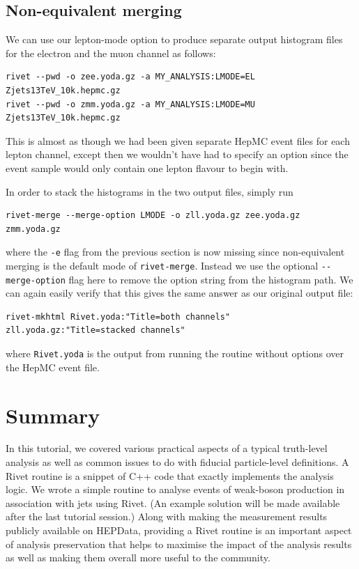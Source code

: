 \documentclass[10pt,fleqn]{scrartcl}
\theoremstyle{exstyle}
\begin{document}
\subsection{Non-equivalent merging}

We can use our lepton-mode option to produce separate output histogram files
for the electron and the muon channel as follows:
\begin{verbatim}
rivet --pwd -o zee.yoda.gz -a MY_ANALYSIS:LMODE=EL Zjets13TeV_10k.hepmc.gz
rivet --pwd -o zmm.yoda.gz -a MY_ANALYSIS:LMODE=MU Zjets13TeV_10k.hepmc.gz
\end{verbatim}
This is almost as though we had been given separate HepMC event files for
each lepton channel, except then we wouldn't have had to specify an option
since the event sample would only contain one lepton flavour to begin with.

In order to stack the histograms in the two output files, simply run
\begin{verbatim}
rivet-merge --merge-option LMODE -o zll.yoda.gz zee.yoda.gz zmm.yoda.gz
\end{verbatim}
where the \verb|-e| flag from the previous section is now missing
since non-equivalent merging is the default mode of \texttt{rivet-merge}.
Instead we use the optional \verb|--merge-option| flag here to remove the
option string from the histogram path. We can again easily verify that
this gives the same answer as our original output file:
\begin{footnotesize}
\begin{verbatim}
rivet-mkhtml Rivet.yoda:"Title=both channels" zll.yoda.gz:"Title=stacked channels"
\end{verbatim}
\end{footnotesize}
where \verb|Rivet.yoda| is the output from running the routine without options
over the HepMC event file.



\section{Summary}

In this tutorial, we covered various practical aspects of a typical truth-level analysis
as well as common issues to do with fiducial particle-level definitions.
A Rivet routine is a snippet of C++ code that exactly implements the analysis logic.
We wrote a simple routine to analyse events of weak-boson production in association
with jets using Rivet.
(An example solution will be made available after the last tutorial session.)
Along with making the measurement results publicly available on HEPData,
providing a Rivet routine is an important aspect of analysis preservation
that helps to maximise the impact of the analysis results as well as
making them overall more useful to the community.
\end{document}
